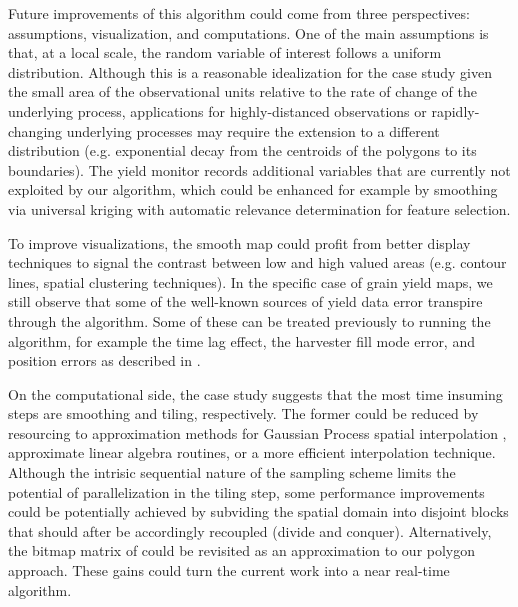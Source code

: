 
 Future improvements of this
algorithm could come from three perspectives: assumptions,
visualization, and computations. One of the main assumptions is that,
at a local scale, the random variable of interest follows a uniform
distribution. Although this is a reasonable idealization for the case
study given the small area of the observational units relative to the
rate of change of the underlying process, applications for
highly-distanced observations or rapidly-changing underlying processes
may require the extension to a different distribution
(e.g. exponential decay from the centroids of the polygons to its
boundaries). The yield monitor records additional variables that are
currently not exploited by our algorithm, which could be enhanced for
example by smoothing via universal kriging with automatic relevance
determination for feature selection.

 To improve visualizations,
the smooth map could profit from better display techniques to signal
the contrast between low and high valued areas (e.g. contour lines,
spatial clustering techniques). In the specific case of grain yield
maps, we still observe that some of the well-known sources of yield
data error transpire through the algorithm. Some of these can be
treated previously to running the algorithm, for example the time lag
effect, the harvester fill mode error, and position errors as
described in \cite{Blackmore1999}.

 On the computational side, the
case study suggests that the most time insuming steps are smoothing
and tiling, respectively. The former could be reduced by resourcing to
approximation methods for Gaussian Process spatial interpolation
\citep{Shi2007,Cressie2008,Katzfuss2011,Nguyen2012,Nguyen2014},
approximate linear algebra routines, or a more efficient interpolation
technique. Although the intrisic sequential nature of the sampling
scheme limits the potential of parallelization in the tiling step,
some performance improvements could be potentially achieved by
subviding the spatial domain into disjoint blocks that should after be
accordingly recoupled (divide and conquer). Alternatively, the bitmap
matrix of \cite{Han1997} could be revisited as an approximation to our
polygon approach. These gains could turn the current work into a near
real-time algorithm.


